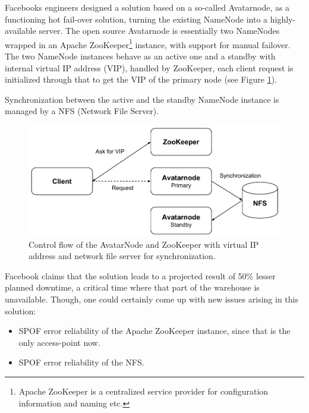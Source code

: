 Facebooks engineers designed a solution based on a so-called Avatarnode, as a functioning hot fail-over solution, turning the existing NameNode into a highly-available server. The open source Avatarnode is essentially two NameNodes wrapped in an Apache ZooKeeper\footnote{Apache ZooKeeper\cite{PageZookeper} is a centralized service provider for configuration information and naming etc.} instance, with support for manual failover. The two NameNode instances behave as an active one and a standby with internal virtual IP address (VIP), handled by ZooKeeper, \ie each client request is initialized through that to get the VIP of the primary node (see Figure \ref{fig:facebook-avatarnode}).
\newline

Synchronization between the active and the standby NameNode instance is managed by a NFS (Network File Server).
\vspace*{3mm}

\begin{figure}[h!]
	\centering
	\includegraphics[scale=0.75]{pdf/facebook-avatarnode.pdf}
	\caption[Avatarnode: Facebooks Hadoop implementation]{Control flow of the AvatarNode and ZooKeeper with virtual IP address and network file server for synchronization. \label{fig:facebook-avatarnode}}
	\vspace*{3mm}
\end{figure}

Facebook claims that the solution leads to a projected result of 50\% lesser planned downtime, \ie a critical time where that part of the warehouse is unavailable. Though, one could certainly come up with new issues arising in this solution:
\begin{itemize}
	\item SPOF error reliability of the Apache ZooKeeper instance, since that is the only access-point now.
	\item SPOF error reliability of the NFS.
\end{itemize}

